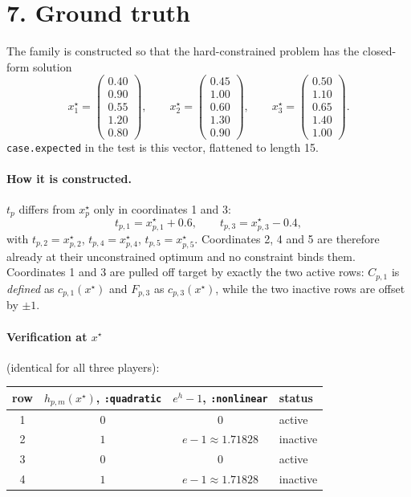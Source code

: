 \documentclass[11pt]{article}
\begin{document}
\section*{7. Ground truth}

The family is constructed so that the hard-constrained problem has the closed-form solution
\[
  x_1^\star = \begin{pmatrix}0.40\\0.90\\0.55\\1.20\\0.80\end{pmatrix},\qquad
  x_2^\star = \begin{pmatrix}0.45\\1.00\\0.60\\1.30\\0.90\end{pmatrix},\qquad
  x_3^\star = \begin{pmatrix}0.50\\1.10\\0.65\\1.40\\1.00\end{pmatrix}.
\]
\texttt{case.expected} in the test is this vector, flattened to length 15.

\paragraph{How it is constructed.} \(t_p\) differs from \(x_p^\star\) only in coordinates 1
and 3:
\[
  t_{p,1} = x_{p,1}^\star + 0.6, \qquad t_{p,3} = x_{p,3}^\star - 0.4,
\]
with \(t_{p,2} = x_{p,2}^\star\), \(t_{p,4} = x_{p,4}^\star\), \(t_{p,5} = x_{p,5}^\star\).
Coordinates 2, 4 and 5 are therefore already at their unconstrained optimum and no constraint
binds them. Coordinates 1 and 3 are pulled off target by exactly the two active rows:
\(C_{p,1}\) is \emph{defined} as \(c_{p,1}(x^\star)\) and \(F_{p,3}\) as \(c_{p,3}(x^\star)\),
while the two inactive rows are offset by \(\pm 1\).

\paragraph{Verification at \(x^\star\)} (identical for all three players):

\begin{center}
\begin{tabular}{cccl}
  \toprule
  row & \(h_{p,m}(x^\star)\), \texttt{:quadratic} & \(e^{h}-1\), \texttt{:nonlinear} & status \\
  \midrule
  1 & \(0\) & \(0\)                    & active \\
  2 & \(1\) & \(e-1 \approx 1.71828\)  & inactive \\
  3 & \(0\) & \(0\)                    & active \\
  4 & \(1\) & \(e-1 \approx 1.71828\)  & inactive \\
  \bottomrule
\end{tabular}
\end{center}
\end{document}
